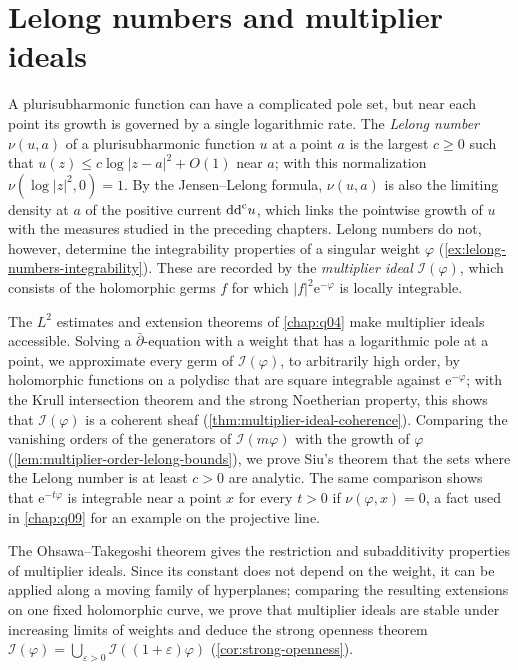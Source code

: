 \chapter{Lelong numbers and multiplier ideals}
\label{chap:q05}

A plurisubharmonic function can have a complicated pole set, but near each point its growth is governed by a single logarithmic rate. The \emph{Lelong number} $\nu(u,a)$ of a plurisubharmonic function $u$ at a point $a$ is the largest $c\geq0$ such that $u(z)\leq c\log|z-a|^2+O(1)$ near $a$; with this normalization $\nu(\log|z|^2,0)=1$. By the Jensen--Lelong formula, $\nu(u,a)$ is also the limiting density at $a$ of the positive current $\mathrm{dd}^{\mathrm{c}} u$, which links the pointwise growth of $u$ with the measures studied in the preceding chapters. Lelong numbers do not, however, determine the integrability properties of a singular weight $\varphi$ (\cref{ex:lelong-numbers-integrability}). These are recorded by the \emph{multiplier ideal} $\mathcal I(\varphi)$, which consists of the holomorphic germs $f$ for which $|f|^2\mathrm e^{-\varphi}$ is locally integrable.

The $L^2$ estimates and extension theorems of \cref{chap:q04} make multiplier ideals accessible. Solving a $\bar\partial$-equation with a weight that has a logarithmic pole at a point, we approximate every germ of $\mathcal I(\varphi)$, to arbitrarily high order, by holomorphic functions on a polydisc that are square integrable against $\mathrm e^{-\varphi}$; with the Krull intersection theorem and the strong Noetherian property, this shows that $\mathcal I(\varphi)$ is a coherent sheaf (\cref{thm:multiplier-ideal-coherence}). Comparing the vanishing orders of the generators of $\mathcal I(m\varphi)$ with the growth of $\varphi$ (\cref{lem:multiplier-order-lelong-bounds}), we prove Siu's theorem that the sets where the Lelong number is at least $c>0$ are analytic. The same comparison shows that $\mathrm e^{-t\varphi}$ is integrable near a point $x$ for every $t>0$ if $\nu(\varphi,x)=0$, a fact used in \cref{chap:q09} for an example on the projective line.

The Ohsawa--Takegoshi theorem gives the restriction and subadditivity properties of multiplier ideals. Since its constant does not depend on the weight, it can be applied along a moving family of hyperplanes; comparing the resulting extensions on one fixed holomorphic curve, we prove that multiplier ideals are stable under increasing limits of weights and deduce the strong openness theorem $\mathcal I(\varphi)=\bigcup_{\varepsilon>0}\mathcal I((1+\varepsilon)\varphi)$ (\cref{cor:strong-openness}).

